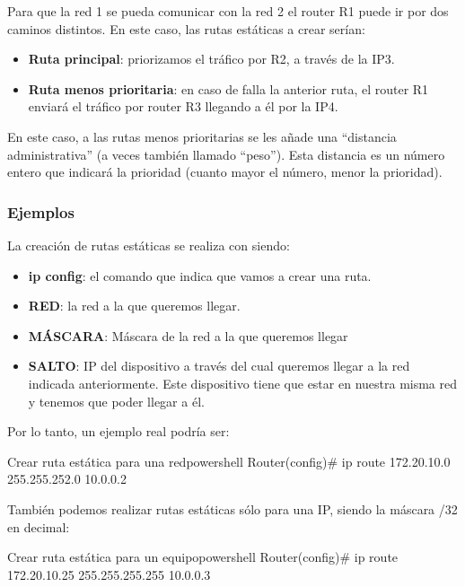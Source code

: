 Para que la red 1 se pueda comunicar con la red 2 el router R1 puede ir por dos caminos distintos. En este caso, las rutas estáticas a crear serían:
\begin{itemize}
    \item \textbf{Ruta principal}: priorizamos el tráfico por R2, a través de la IP3.
    \item \textbf{Ruta menos prioritaria}: en caso de falla la anterior ruta, el router R1 enviará el tráfico por router R3 llegando a él por la IP4.
\end{itemize}

En este caso, a las rutas menos prioritarias se les añade una “distancia administrativa” (a veces también llamado “peso”). Esta distancia es un número entero que indicará la prioridad (cuanto mayor el número, menor la prioridad).

\subsubsection{Ejemplos}

La creación de rutas estáticas se realiza con  siendo:
\begin{itemize}
    \item \textbf{ip config}: el comando que indica que vamos a crear una ruta.
    \item \textbf{RED}: la  red a la que queremos llegar.
    \item \textbf{MÁSCARA}: Máscara de la red a la que queremos llegar
    \item \textbf{SALTO}: IP del dispositivo a través del cual queremos llegar a la red indicada anteriormente.  Este dispositivo tiene que estar en nuestra misma red y tenemos que poder llegar a él.
\end{itemize}

Por lo tanto, un ejemplo real podría ser:


\begin{mycode}{Crear ruta estática para una red}{powershell}{}
Router(config)# ip route 172.20.10.0  255.255.252.0  10.0.0.2
\end{mycode}

También podemos realizar rutas estáticas sólo para una IP, siendo la máscara /32 en decimal:

\begin{mycode}{Crear ruta estática para un equipo}{powershell}{}
Router(config)# ip route 172.20.10.25  255.255.255.255  10.0.0.3
\end{mycode}

